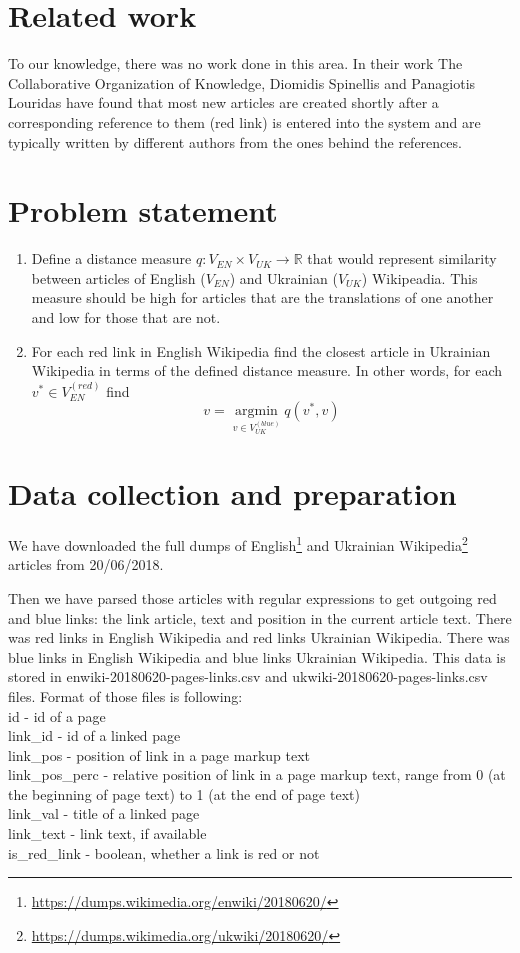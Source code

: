 \documentclass[11pt,a4paper]{article}
\begin{document}
\section{Related work}

To our knowledge, there was no work done in this area. In their work The Collaborative Organization of Knowledge, Diomidis Spinellis and Panagiotis Louridas \cite{spinellis} have found that most new articles are created shortly after a corresponding reference to them (red link) is entered into the system and are typically written by different authors from the ones behind the references.

\section{Problem statement}

\begin{enumerate}
	\item Define a distance measure $q: V_{EN} \times V_{UK} \to \mathbb{R}$ that would represent similarity between articles of English ($V_{EN}$) and Ukrainian ($V_{UK}$) Wikipeadia. This measure should be high for articles that are the translations of one another and low for those that are not.
	\item For each red link in English Wikipedia find the closest article in Ukrainian Wikipedia in terms of the defined distance measure. In other words, for each $v^{*} \in V_{EN}^{(red)}$ find
	\[ v = \operatorname*{argmin}_{v \in V_{UK}^{(blue)}} q(v^{*}, v) \]
\end{enumerate}

\section{Data collection and preparation}

We have downloaded the full dumps of English\footnote{\url{https://dumps.wikimedia.org/enwiki/20180620/}} and Ukrainian Wikipedia\footnote{\url{https://dumps.wikimedia.org/ukwiki/20180620/}} articles from 20/06/2018. 

Then we have parsed those articles with regular expressions to get outgoing red and blue links: the link article, text and position in the current article text. There was red links in English Wikipedia and red links Ukrainian Wikipedia. There was blue links in English Wikipedia and blue links Ukrainian Wikipedia. This data is stored in enwiki-20180620-pages-links.csv and ukwiki-20180620-pages-links.csv files. Format of those files is following:\\
id - id of a page\\
link\_id - id of a linked page\\
link\_pos - position of link in a page markup text\\  
link\_pos\_perc - relative position of link in a page markup text, range from 0 (at the beginning of page text) to 1 (at the end of page text)\\  
link\_val - title of a linked page\\  
link\_text - link text, if available\\  
is\_red\_link - boolean, whether a link is red or not\\  
\end{document}
